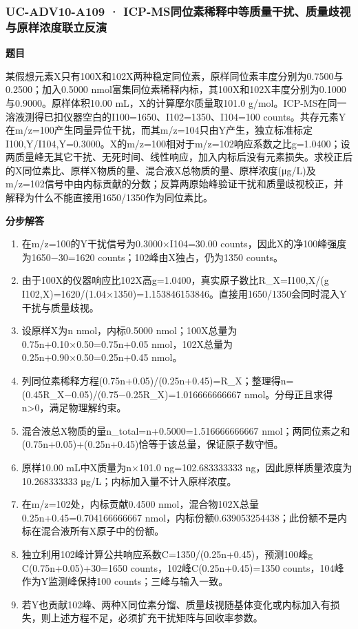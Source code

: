 \documentclass[UTF8,11pt,a4paper]{ctexart}
\begin{document}
\subsubsection*{UC-ADV10-A109 · ICP-MS同位素稀释中等质量干扰、质量歧视与原样浓度联立反演}
\noindent\textbf{题目}\par
某假想元素X只有100X和102X两种稳定同位素，原样同位素丰度分别为0.7500与0.2500；加入0.5000 nmol富集同位素稀释内标，其100X和102X丰度分别为0.1000与0.9000。原样体积10.00 mL，X的计算摩尔质量取101.0 g/mol。ICP-MS在同一溶液测得已扣仪器空白的I100=1650、I102=1350、I104=100 counts。共存元素Y在m/z=100产生同量异位干扰，而其m/z=104只由Y产生，独立标准标定I100,Y/I104,Y=0.3000。X的m/z=100相对于m/z=102响应系数之比g=1.0400；设两质量峰无其它干扰、无死时间、线性响应，加入内标后没有元素损失。求校正后的X同位素比、原样X物质的量、混合液X总物质的量、原样浓度(μg/L)及m/z=102信号中由内标贡献的分数；反算两原始峰验证干扰和质量歧视校正，并解释为什么不能直接用1650/1350作为同位素比。\par
\medskip\noindent\textbf{分步解答}
\begin{enumerate}
\item 在m/z=100的Y干扰信号为0.3000×I104=30.00 counts，因此X的净100峰强度为1650−30=1620 counts；102峰由X独占，仍为1350 counts。
\item 由于100X的仪器响应比102X高g=1.0400，真实原子数比R\_X=I100,X/(g I102,X)=1620/(1.04×1350)=1.153846153846。直接用1650/1350会同时混入Y干扰与质量歧视。
\item 设原样X为n nmol，内标0.5000 nmol；100X总量为0.75n+0.10×0.50=0.75n+0.05 nmol，102X总量为0.25n+0.90×0.50=0.25n+0.45 nmol。
\item 列同位素稀释方程(0.75n+0.05)/(0.25n+0.45)=R\_X；整理得n=(0.45R\_X−0.05)/(0.75−0.25R\_X)=1.016666666667 nmol。分母正且求得n>0，满足物理解约束。
\item 混合液总X物质的量n\_total=n+0.5000=1.516666666667 nmol；两同位素之和(0.75n+0.05)+(0.25n+0.45)恰等于该总量，保证原子数守恒。
\item 原样10.00 mL中X质量为n×101.0 ng=102.683333333 ng，因此原样质量浓度为10.268333333 μg/L；内标加入量不计入原样浓度。
\item 在m/z=102处，内标贡献0.4500 nmol，混合物102X总量0.25n+0.45=0.704166666667 nmol，内标份额0.639053254438；此份额不是内标在混合液所有X原子中的份额。
\item 独立利用102峰计算公共响应系数C=1350/(0.25n+0.45)，预测100峰g C(0.75n+0.05)+30=1650 counts，102峰C(0.25n+0.45)=1350 counts，104峰作为Y监测峰保持100 counts；三峰与输入一致。
\item 若Y也贡献102峰、两种X同位素分馏、质量歧视随基体变化或内标加入有损失，则上述方程不足，必须扩充干扰矩阵与回收率参数。
\end{enumerate}
\end{document}
